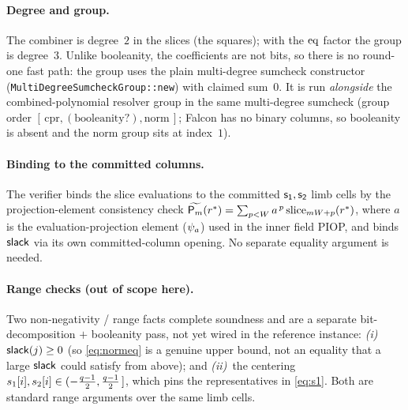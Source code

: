 \paragraph{Degree and group.}
The combiner is degree~$2$ in the slices (the squares); with the
$\operatorname{eq}$ factor the group is degree~$3$. Unlike booleanity, the
coefficients are not bits, so there is no round-one fast path: the group
uses the plain multi-degree sumcheck constructor
(\texttt{MultiDegreeSumcheckGroup::new}) with claimed sum~$0$. It is run
\emph{alongside} the combined-polynomial resolver group in the same
multi-degree sumcheck (group order $[\,\text{cpr}, (\text{booleanity?}),
\text{norm}\,]$; Falcon has no binary columns, so booleanity is absent and
the norm group sits at index~$1$).

\paragraph{Binding to the committed columns.}
The verifier binds the slice evaluations to the committed
$\mathsf{s_1},\mathsf{s_2}$ limb cells by the projection-element consistency
check
$\widetilde{\mathsf{P}_m}(r^\ast) = \sum_{p<W} a^{\,p}\,\mathrm{slice}_{mW+p}(r^\ast)$,
where $a$ is the evaluation-projection element ($\psi_{a}$) used in
the inner field PIOP, and binds $\mathsf{slack}$ via its own committed-column
opening. No separate equality argument is needed.

\paragraph{Range checks (out of scope here).}
Two non-negativity / range facts complete soundness and are a separate
bit-decomposition $+$ booleanity pass, not yet wired in the reference
instance: \emph{(i)}~$\mathsf{slack}(j)\ge 0$ (so \eqref{eq:normeq} is a
genuine upper bound, not an equality that a large $\mathsf{slack}$ could
satisfy from above); and \emph{(ii)}~the centering
$s_1[i],s_2[i]\in(-\tfrac{q-1}{2},\tfrac{q-1}{2}\,]$, which pins the representatives in
\eqref{eq:s1}. Both are standard range arguments over the same limb cells.
